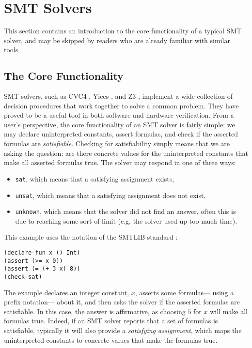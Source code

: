 \documentclass{sigplanconf}
\begin{document}
\section {SMT Solvers}
\label{smt}

This section contains an introduction to the core functionality
of a typical SMT solver, and may be skipped by readers who are already
familiar with similar tools.

\subsection{The Core Functionality}

SMT solvers, such as CVC4 \cite{cvc4}, Yices \cite{yices}, and Z3
\cite{z3}, implement a wide collection of decision procedures that
work together to solve a common problem.  They have proved to be a useful
tool in both software and hardware verification.
From a user's perspective, the core functionality of an SMT solver is fairly
simple: we may declare uninterpreted constants, assert formulas,
and check if the asserted formulas are {\em satisfiable}.  Checking
for satisfiability simply means that we are asking the
question: are there concrete values for the uninterpreted constants
that make all asserted formulas true. The solver may respond in
one of three ways:
\begin{itemize}
\item \Verb"sat", which means that a satisfying assignment exists,
\item \Verb"unsat", which means that a satisfying assignment does not exist,
\item \Verb"unknown", which means that the solver did not find an answer,
      often this is due to reaching some sort of limit (e.g, the solver
      used up too much time).
\end{itemize}

This example uses the notation of the SMTLIB standard \cite{smtlib2}:

\begin{Verbatim}
(declare-fun x () Int)
(assert (>= x 0))
(assert (= (+ 3 x) 8))
(check-sat)
\end{Verbatim}

The example declares an integer constant, $x$, asserts some formulas---%
using a prefix notation---%
about it, and then asks the solver if the asserted formulas are
satisfiable.  In this case, the answer is affirmative, as choosing
$5$ for $x$ will make all formulas true.  Indeed, if an
SMT solver reports that a set of formulas is satisfiable, typically
it will also provide a {\em satisfying assignment}, which maps
the uninterpreted constants to concrete values that make the
formulas true.
\end{document}
